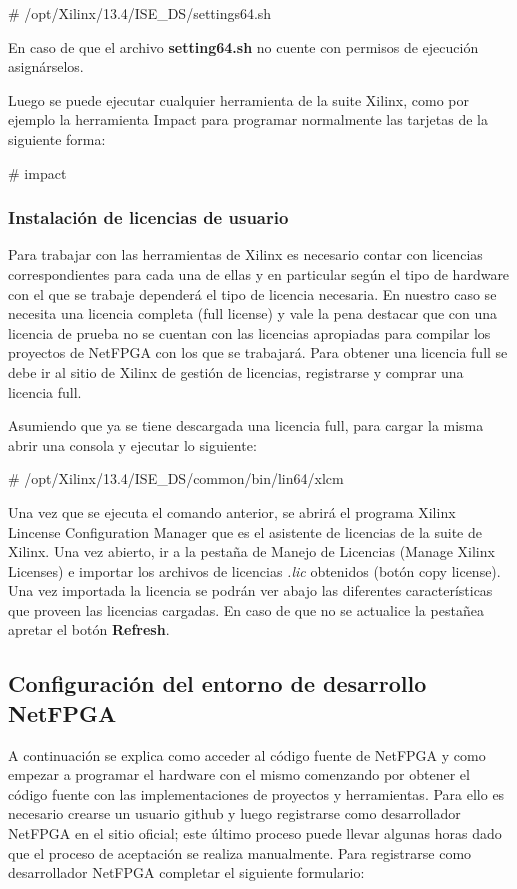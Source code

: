 \begin{bash}
# /opt/Xilinx/13.4/ISE_DS/settings64.sh
\end{bash}

En caso de que el archivo \textbf{setting64.sh} no cuente con permisos de ejecución asignárselos. 

Luego se puede ejecutar cualquier herramienta de la suite Xilinx, como por ejemplo la herramienta Impact para programar normalmente las tarjetas de la siguiente forma:

\begin{bash}
# impact
\end{bash}

\subsubsection{Instalación de licencias de usuario}
Para trabajar con las herramientas de Xilinx es necesario contar con licencias correspondientes para cada una de ellas y en particular seg\'un el tipo de hardware con el que se trabaje dependerá el tipo de licencia necesaria. En nuestro caso se necesita una licencia completa (full license) y vale la pena destacar que con una licencia de prueba no se cuentan con las licencias apropiadas para compilar los proyectos de NetFPGA con los que se trabajar\'a. Para obtener una licencia full se debe ir al sitio de Xilinx de gestión de licencias, registrarse y comprar una licencia full.

Asumiendo que ya se tiene descargada una licencia full, para cargar la misma abrir una consola y ejecutar lo siguiente:

\begin{bash}
# /opt/Xilinx/13.4/ISE_DS/common/bin/lin64/xlcm
\end{bash}

Una vez que se ejecuta el comando anterior, se abrirá el programa  Xilinx Lincense Configuration Manager que es el asistente de licencias de la suite de Xilinx. Una vez abierto, ir a la pestaña de Manejo de Licencias (Manage Xilinx Licenses) e importar los archivos de licencias \emph{.lic} obtenidos (botón copy license). Una vez importada la licencia se podrán ver abajo las diferentes características que proveen las licencias cargadas. En caso de que no se actualice la pestañea apretar el botón \textbf{Refresh}.

\subsection{Configuración del entorno de desarrollo NetFPGA}
A continuación se explica como acceder al código fuente de NetFPGA y como empezar a programar el hardware con el mismo comenzando por obtener el código fuente con las implementaciones de proyectos y herramientas. Para ello es necesario crearse un usuario github y luego registrarse como desarrollador NetFPGA en el sitio oficial; este último proceso puede llevar algunas horas dado que el proceso de aceptación se realiza manualmente. Para registrarse como desarrollador NetFPGA completar el siguiente formulario:

